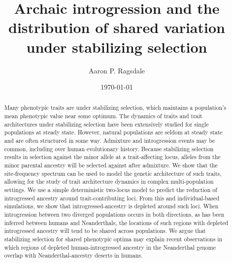 \documentclass[10pt,letterpaper]{article}
\title{Archaic introgression and the distribution
of shared variation under stabilizing selection}
\author[]{Aaron P. Ragsdale}
\affil[]{apragsdale@wisc.edu}
\affil[]{Department of Integrative Biology, University of Wisconsin--Madison, WI 53706}
\date{\today}
\begin{document}
\maketitle

\begin{abstract}

    \noindent Many phenotypic traits are under stabilizing selection, which
    maintains a population's mean phenotypic value near some optimum. The
    dynamics of traits and trait architectures under stabilizing selection have
    been extensively studied for single populations at steady state. However,
    natural populations are seldom at steady state and are often structured in
    some way. Admixture and introgression events may be common, including over
    human evolutionary history. Because stabilizing selection results in
    selection against the minor allele at a trait-affecting locus, alleles from
    the minor parental ancestry will be selected against after admixture. We
    show that the site-frequency spectrum can be used to model the genetic
    architecture of such traits, allowing for the study of trait architecture
    dynamics in complex multi-population settings. We use a simple
    deterministic two-locus model to predict the reduction of introgressed
    ancestry around trait-contributing loci. From this and individual-based
    simulations, we show that introgressed-ancestry is depleted around such
    loci. When introgression between two diverged populations occurs in both
    directions, as has been inferred between humans and Neanderthals, the
    locations of such regions with depleted introgressed ancestry will tend to
    be shared across populations. We argue that stabilizing selection for
    shared phenotypic optima may explain recent observations in which regions
    of depleted human-introgressed ancestry in the Neanderthal genome overlap
    with Neanderthal-ancestry deserts in humans.

\end{abstract}
\end{document}
